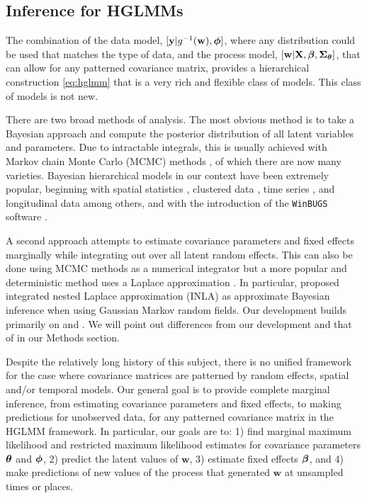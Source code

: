 \documentclass[12pt, titlepage]{article}
\begin{document}
\subsection{Inference for HGLMMs}

The combination of the data model, $[\mathbf{y}|g^{-1}(\mathbf{w}),\boldsymbol{\phi}]$, where any distribution could be used that matches the type of data, and the process model, $[\mathbf{w}|\mathbf{X}, \boldsymbol{\beta},\mbox{\boldmath $\Sigma$}_{\boldsymbol{\theta}}]$, that can allow for any patterned covariance matrix, provides a hierarchical construction \eqref{eq:hglmm} that is a very rich and flexible class of models.  This class of models is not new.

There are two broad methods of analysis.  The most obvious method is to take a Bayesian approach and compute the posterior distribution of all latent variables and parameters.  Due to intractable integrals, this is usually achieved with Markov chain Monte Carlo (MCMC) methods \citep{GelfandEtAl1990Samplingbasedapproachescalculating398, GilksEtAl1996IntroducingMarkovchain1}, of which there are now many varieties.  Bayesian hierarchical models in our context have been extremely popular, beginning with spatial statistics \citep[e.g.][]{clayton_empirical_1987}, clustered data \citep[e.g.][]{zeger_generalized_1991}, time series \citep[e.g.][]{berliner_hierarchical_1996}, and longitudinal data \citep{kleinman_semi-parametric_1998} among others, and with the introduction of the \texttt{WinBUGS} software \citep{lunn_winbugs_2000}. 

A second approach attempts to estimate covariance parameters and fixed effects marginally while integrating out over all latent random effects.  This can also be done using MCMC methods as a numerical integrator \citep[e.g.,][]{zhang_estimation_2002, christensen_monte_2004} but a more popular and deterministic method uses a Laplace approximation \citep{tierney_accurate_1986}.  In particular, \citet{rue_approximate_2009} proposed integrated nested Laplace approximation (INLA) as approximate Bayesian inference when using Gaussian Markov random fields. Our development builds primarily on \citet{evangelou_estimation_2011} and \citet{ bonat_practical_2016}.  We will point out differences from our development and that of \citet{ bonat_practical_2016} in our Methods section. 

Despite the relatively long history of this subject, there is no unified framework for the case where covariance matrices are patterned by random effects, spatial and/or temporal models.  Our general goal is to provide complete marginal inference, from estimating covariance parameters and fixed effects, to making predictions for unobserved data, for any patterned covariance matrix in the HGLMM framework.  In particular, our goals are to: 1) find marginal maximum likelihood and restricted maximum likelihood estimates for covariance parameters $\boldsymbol{\theta}$ and $\boldsymbol{\phi}$, 2) predict the latent values of $\mathbf{w}$, 3) estimate fixed effects $\boldsymbol{\beta}$, and 4) make predictions of new values of the process that generated $\mathbf{w}$ at unsampled times or places.
\end{document}
